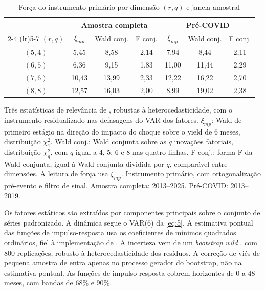 \documentclass[
article,			%
12pt,				%
oneside,			%
a4paper,			%
hidelinks, 
english,			%
brazil,				%
]{abntex2}
\theoremstyle{plain}
\theoremstyle{definition}
\theoremstyle{remark}
\begin{document}
\begin{table}[H]
\centering
\caption{Força do instrumento primário por dimensão $(r, q)$ e janela amostral}
\label{tab:rq_sweep}
\begin{threeparttable}
\begin{tabular}{c ccc ccc}
\toprule
 & \multicolumn{3}{c}{Amostra completa} & \multicolumn{3}{c}{Pré-COVID} \\
\cmidrule(lr){2-4} \cmidrule(lr){5-7}
$(r, q)$ & $\xi_{mp}$ & Wald conj. & F conj. & $\xi_{mp}$ & Wald conj. & F conj. \\
\midrule
$(5, 4)$ &  5,45 &  8,58 & 2,14 &  7,94 &  8,44 & 2,11 \\
$(6, 5)$ &  6,36 &  9,15 & 1,83 & 11,00 & 11,44 & 2,29 \\
$(7, 6)$ & 10,43 & 13,99 & 2,33 & 12,22 & 16,22 & 2,70 \\
$(8, 8)$ & 12,57 & 16,03 & 2,00 &  8,99 & 19,02 & 2,38 \\
\bottomrule
\end{tabular}
\begin{tablenotes}[flushleft]
\footnotesize
\item Três estatísticas de relevância de , robustas à heterocedasticidade, com o instrumento residualizado nas defasagens do VAR dos fatores. $\xi_{mp}$: Wald de primeiro estágio na direção do impacto do choque sobre o yield de 6 meses, distribuição $\chi^2_1$. Wald conj.: Wald conjunta sobre as $q$ inovações fatoriais, distribuição $\chi^2_q$, com $q$ igual a 4, 5, 6 e 8 nas quatro linhas. F conj.: forma-F da Wald conjunta, igual à Wald conjunta dividida por $q$, comparável entre dimensões. A leitura de força usa $\xi_{mp}$. Instrumento primário, com ortogonalização pré-evento e filtro de sinal. Amostra completa: 2013--2025. Pré-COVID: 2013--2019.
\end{tablenotes}
\end{threeparttable}
\end{table}

Os fatores estáticos são extraídos por componentes principais sobre o conjunto de séries padronizado. A dinâmica segue o VAR(6) da \cref{eq:5}. A estimativa pontual das funções de impulso-resposta usa os coeficientes de mínimos quadrados ordinários, fiel à implementação de . A incerteza vem de um \textit{bootstrap wild} \cite{goncalveskilian2004}, com 800 replicações, robusto à heterocedasticidade dos resíduos. A correção de viés de pequena amostra de  entra apenas no processo gerador do bootstrap, não na estimativa pontual. As funções de impulso-resposta cobrem horizontes de 0 a 48 meses, com bandas de 68\% e 90\%.
\end{document}
